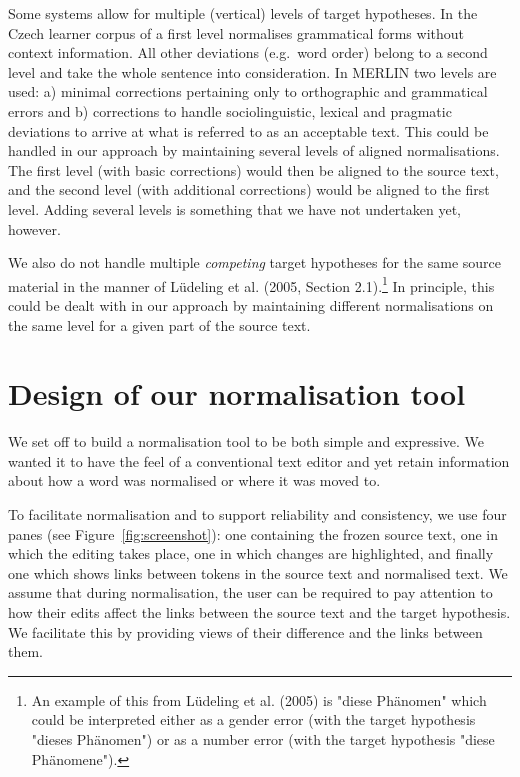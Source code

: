 \documentclass[10pt, a4paper]{article}
\newcommand{\dan}[1]{{\color{Fuchsia}{Dan: #1}}}
\begin{document}
Some systems allow for multiple (vertical) levels of target hypotheses. In the Czech learner corpus of  a
first level normalises grammatical forms without context information. All other deviations (e.g.\ word order) belong to a second level and take the whole sentence into consideration.
In MERLIN \cite{MERLIN2014} two levels are used: a) minimal corrections pertaining only to orthographic and grammatical errors and b) corrections to handle sociolinguistic, lexical and pragmatic deviations to arrive at what is referred to as an acceptable text. This could be handled in our approach by maintaining several levels of aligned normalisations. The first level (with basic corrections) would then be aligned to the source text, and the second level (with additional corrections) would be aligned to the first level. Adding several levels is something that we have not undertaken yet, however.

We also do not handle multiple {\em competing} target hypotheses for the same source material in the manner of L{\"u}deling et al. (2005, Section 2.1).\footnote{An example of this from L{\"u}deling et al. (2005) is "diese Ph{\"a}nomen" which could be interpreted either as a gender error (with the target hypothesis "dieses Ph{\"a}nomen") or as a number error (with the target hypothesis "diese Ph{\"a}nomene").} In principle, this could be dealt with in our approach by maintaining different normalisations on the same level for a given part of the source text.

\section{Design of our normalisation tool}
\label{sec:norm_tool}
\dan{Should we name the tool?}

We set off to build a normalisation tool to be both simple and expressive.
We wanted it to have the feel of a conventional text editor and yet retain
information about how a word was normalised or where it was moved to.
\dan{Comment that we did not find any tool fulfilling our wishes/requirements?}

To facilitate normalisation and to support reliability and consistency,
we use four panes (see Figure~\ref{fig:screenshot}): one containing the
frozen source text, one in which the editing takes place, one in which
changes are highlighted, and finally one which shows links between tokens in the source text and normalised text.
We assume that during normalisation, the user can be required to pay attention
to how their edits affect the links between the source text and the target
hypothesis. We facilitate this by providing views of their difference and
the links between them.
\end{document}
